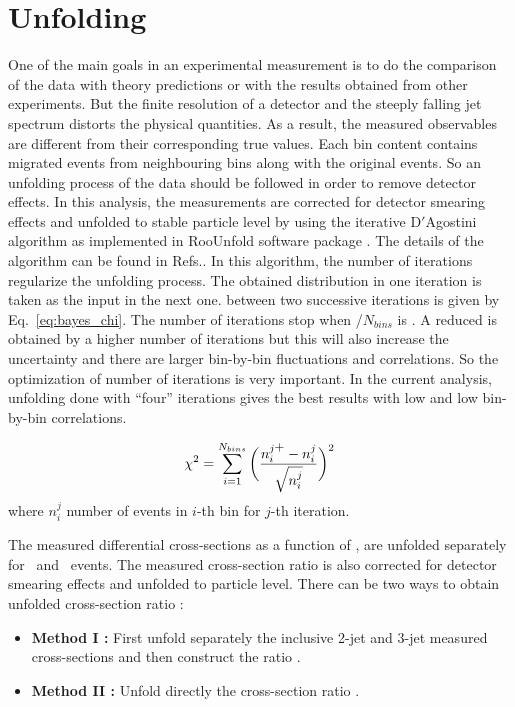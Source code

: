 \section{Unfolding}
\label{sec:unfolding}
One of the main goals in an experimental measurement is to do the comparison of the data with theory predictions or with the results obtained from other experiments. But the finite resolution of a detector and the steeply falling jet \pt spectrum distorts the physical quantities. As a result, the measured observables are different from their corresponding true values. Each \pt bin content contains migrated events from neighbouring bins along with the original events. So an unfolding process of the data should be followed in order to remove detector effects. In this analysis, the measurements are corrected for detector smearing effects and unfolded to stable particle level by using the iterative D$'$Agostini algorithm as implemented in RooUnfold software package \cite{Adye:2011gm}. The details of the algorithm can be found in Refs.\cite{DAgostini:1994fjx,DAgostini}. In this algorithm, the number of iterations regularize the unfolding process. The obtained distribution in one iteration is taken as the input in the next one. \chisq between two successive iterations is given by Eq.~\ref{eq:bayes_chi}. The number of iterations stop when \chisq/$N_{bins}$ is . A reduced \chisq is obtained by a higher number of iterations but this will also increase the uncertainty and there are larger bin-by-bin fluctuations and correlations. So the optimization of number of iterations is very important. In the current analysis, unfolding done with ``four'' iterations gives the best results with low \chisq and low bin-by-bin correlations.

\begin{equation}
\label{eq:bayes_chi}
\chisq = \sum\limits_{i=1}^{N_{bins}}\bigg(\frac{n^{j\plusn}_{i} - n^{j}_{i}}{\sqrt{n^{j}_{i}}}\bigg)^{2}
\end{equation} 
where $n^{j}_{i}$ number of events in $i$-th bin for $j$-th iteration. 

The measured differential cross-sections as a function of \httwo, are unfolded separately for \njt~and \njth~events. The measured cross-section ratio \ratio is also corrected for detector smearing effects and unfolded to particle level. There can be two ways to obtain unfolded cross-section ratio :

\begin{itemize}
\item {\bf Method I :} First unfold separately the inclusive 2-jet and 3-jet measured cross-sections and then construct the ratio \ratio. 
\item {\bf Method II :} Unfold directly the cross-section ratio \ratio.
\end{itemize}


